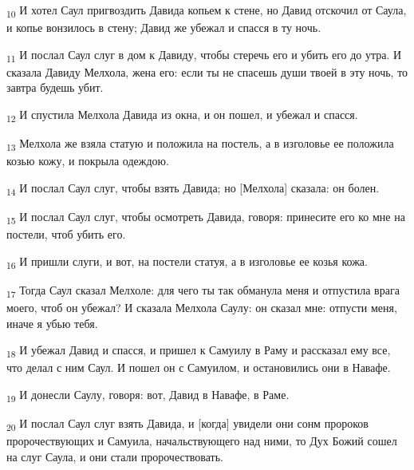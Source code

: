 \begin{tcolorbox}
\textsubscript{10} И хотел Саул пригвоздить Давида копьем к стене, но Давид отскочил от Саула, и копье вонзилось в стену; Давид же убежал и спасся в ту ночь.
\end{tcolorbox}
\begin{tcolorbox}
\textsubscript{11} И послал Саул слуг в дом к Давиду, чтобы стеречь его и убить его до утра. И сказала Давиду Мелхола, жена его: если ты не спасешь души твоей в эту ночь, то завтра будешь убит.
\end{tcolorbox}
\begin{tcolorbox}
\textsubscript{12} И спустила Мелхола Давида из окна, и он пошел, и убежал и спасся.
\end{tcolorbox}
\begin{tcolorbox}
\textsubscript{13} Мелхола же взяла статую и положила на постель, а в изголовье ее положила козью кожу, и покрыла одеждою.
\end{tcolorbox}
\begin{tcolorbox}
\textsubscript{14} И послал Саул слуг, чтобы взять Давида; но [Мелхола] сказала: он болен.
\end{tcolorbox}
\begin{tcolorbox}
\textsubscript{15} И послал Саул слуг, чтобы осмотреть Давида, говоря: принесите его ко мне на постели, чтоб убить его.
\end{tcolorbox}
\begin{tcolorbox}
\textsubscript{16} И пришли слуги, и вот, на постели статуя, а в изголовье ее козья кожа.
\end{tcolorbox}
\begin{tcolorbox}
\textsubscript{17} Тогда Саул сказал Мелхоле: для чего ты так обманула меня и отпустила врага моего, чтоб он убежал? И сказала Мелхола Саулу: он сказал мне: отпусти меня, иначе я убью тебя.
\end{tcolorbox}
\begin{tcolorbox}
\textsubscript{18} И убежал Давид и спасся, и пришел к Самуилу в Раму и рассказал ему все, что делал с ним Саул. И пошел он с Самуилом, и остановились они в Навафе.
\end{tcolorbox}
\begin{tcolorbox}
\textsubscript{19} И донесли Саулу, говоря: вот, Давид в Навафе, в Раме.
\end{tcolorbox}
\begin{tcolorbox}
\textsubscript{20} И послал Саул слуг взять Давида, и [когда] увидели они сонм пророков пророчествующих и Самуила, начальствующего над ними, то Дух Божий сошел на слуг Саула, и они стали пророчествовать.
\end{tcolorbox}
